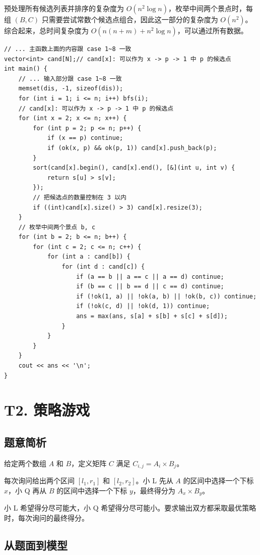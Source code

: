 \documentclass{book}
\begin{document}
预处理所有候选列表并排序的复杂度为 $O(n^2\log n)$，枚举中间两个景点时，每组 $(B,C)$ 只需要尝试常数个候选点组合，因此这一部分的复杂度为 $O(n^2)$。综合起来，总时间复杂度为 $O(n(n+m)+n^2\log n)$，可以通过所有数据。

\newpage
\begin{lstlisting}[style = code]
// ... 主函数上面的内容跟 case 1~8 一致
vector<int> cand[N];// cand[x]: 可以作为 x -> p -> 1 中 p 的候选点
int main() {
    // ... 输入部分跟 case 1~8 一致
    memset(dis, -1, sizeof(dis));
    for (int i = 1; i <= n; i++) bfs(i);
    // cand[x]: 可以作为 x -> p -> 1 中 p 的候选点
    for (int x = 2; x <= n; x++) {
        for (int p = 2; p <= n; p++) {
            if (x == p) continue;
            if (ok(x, p) && ok(p, 1)) cand[x].push_back(p);
        }
        sort(cand[x].begin(), cand[x].end(), [&](int u, int v) {
            return s[u] > s[v];
        });
        // 把候选点的数量控制在 3 以内
        if ((int)cand[x].size() > 3) cand[x].resize(3);
    }
    // 枚举中间两个景点 b, c
    for (int b = 2; b <= n; b++) {
        for (int c = 2; c <= n; c++) {
            for (int a : cand[b]) {
                for (int d : cand[c]) {
                    if (a == b || a == c || a == d) continue;
                    if (b == c || b == d || c == d) continue;
                    if (!ok(1, a) || !ok(a, b) || !ok(b, c)) continue;
                    if (!ok(c, d) || !ok(d, 1)) continue;
                    ans = max(ans, s[a] + s[b] + s[c] + s[d]);
                }
            }
        }
    }
    cout << ans << '\n';
}
\end{lstlisting}
\newpage
\section{T2. 策略游戏}
\subsection{题意简析}

给定两个数组 $A$ 和 $B$，定义矩阵 $C$ 满足 $C_{i,j}=A_i\times B_j$。

每次询问给出两个区间 $[l_1,r_1]$ 和 $[l_2,r_2]$。小 L 先从 $A$ 的区间中选择一个下标 $x$，小 Q 再从 $B$ 的区间中选择一个下标 $y$，最终得分为 $A_x\times B_y$。

小 L 希望得分尽可能大，小 Q 希望得分尽可能小。要求输出双方都采取最优策略时，每次询问的最终得分。

\subsection{从题面到模型}
\end{document}
